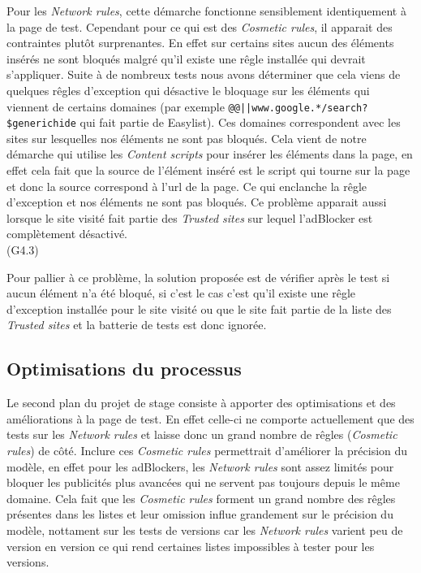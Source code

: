 \documentclass[oneside,a4paper,12pt]{article}
\begin{document}
Pour les \textit{Network rules}, cette démarche fonctionne sensiblement identiquement à la page de test. Cependant pour ce qui est des \textit{Cosmetic rules}, il apparait des contraintes plutôt surprenantes. En effet sur certains sites aucun des éléments insérés ne sont bloqués malgré qu'il existe une rêgle installée qui devrait s'appliquer. Suite à de nombreux tests nous avons déterminer que cela viens de quelques rêgles d'exception qui désactive le bloquage sur les éléments qui viennent de certains domaines (par exemple \lstinline{@@||www.google.*/search?$generichide} qui fait partie de Easylist). Ces domaines correspondent avec les sites sur lesquelles nos éléments ne sont pas bloqués. Cela vient de notre démarche qui utilise les \textit{Content scripts} pour insérer les éléments dans la page, en effet cela fait que la source de l'élément inséré est le script qui tourne sur la page et donc la source correspond à l'url de la page. Ce qui enclanche la rêgle d'exception et nos éléments ne sont pas bloqués. Ce problème apparait aussi lorsque le site visité fait partie des \textit{Trusted sites} sur lequel l'adBlocker est complètement désactivé.\\ (G4.3)

Pour pallier à ce problème, la solution proposée est de vérifier après le test si aucun élément n'a été bloqué, si c'est le cas c'est qu'il existe une rêgle d'exception installée pour le site visité ou que le site fait partie de la liste des \textit{Trusted sites} et la batterie de tests est donc ignorée.

\subsection{Optimisations du processus}\label{Projet:opti}

Le second plan du projet de stage consiste à apporter des optimisations et des améliorations à la page de test. En effet celle-ci ne comporte actuellement que des tests sur les \textit{Network rules} et laisse donc un grand nombre de rêgles (\textit{Cosmetic rules}) de côté. Inclure ces \textit{Cosmetic rules} permettrait d'améliorer la précision du modèle, en effet pour les adBlockers, les \textit{Network rules} sont assez limités pour bloquer les publicités plus avancées qui ne servent pas toujours depuis le même domaine. Cela fait que les \textit{Cosmetic rules} forment un grand nombre des rêgles présentes dans les listes et leur omission influe grandement sur le précision du modèle, nottament sur les tests de versions car les \textit{Network rules} varient peu de version en version ce qui rend certaines listes impossibles à tester pour les versions.\\
\end{document}
